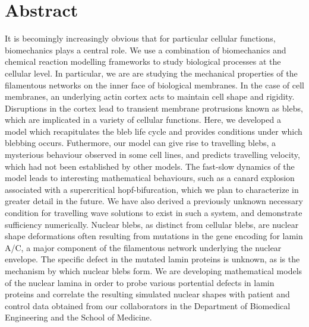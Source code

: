 \chapter{Abstract}

It is becomingly increasingly obvious that for particular cellular functions, biomechanics plays a central role. We use a combination of biomechanics and chemical reaction modelling frameworks to study biological processes at the cellular level. In particular, we are are studying the mechanical properties of the filamentous networks on the inner face of biological membranes. In the case of cell membranes, an underlying actin cortex acts to maintain cell shape and rigidity. Disruptions in the cortex lead to transient membrane protrusions known as blebs, which are implicated in a variety of cellular functions. Here, we developed a model which recapitulates the bleb life cycle and provides conditions under which blebbing occurs. Futhermore, our model can give rise to travelling blebs, a mysterious behaviour observed in some cell lines, and predicts travelling velocity, which had not been established by other models. The fast-slow dynamics of the model leads to interesting mathematical behaviours, such as a canard explosion associated with a supercritical hopf-bifurcation, which we plan to characterize in greater detail in the future. We have also derived a previously unknown necessary condition for travelling wave solutions to exist in such a system, and demonstrate sufficiency numerically. Nuclear blebs, as distinct from cellular blebs, are nuclear shape deformations often resulting from mutations in the gene encoding for lamin A/C, a major component of the filamentous network underlying the nuclear envelope. The specific defect in the mutated lamin proteins is unknown, as is the mechanism by which nuclear blebs form. We are developing mathematical models of the nuclear lamina in order to probe various portential defects in lamin proteins and correlate the resulting simulated nuclear shapes with patient and control data obtained from our collaborators in the Department of Biomedical Engineering  and the School of Medicine. 

